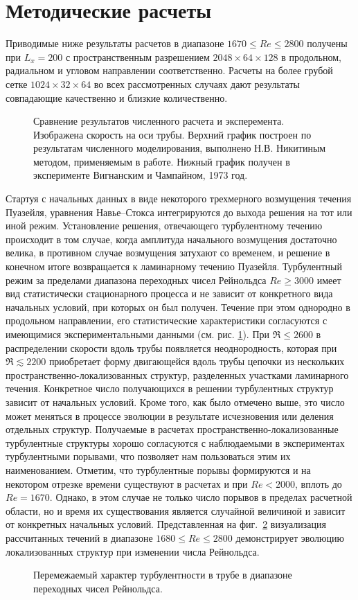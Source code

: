 \section{Методические расчеты} 
	\label{puff_calc}



Приводимые ниже результаты расчетов в диапазоне $1670\leqslant Re\leqslant 2800$ получены при $L_x=200$ с пространственным разрешением $2048 \times 64 \times 128$ в продольном, радиальном и угловом направлении соответственно. Расчеты на более грубой сетке $1024\times32\times64$ во всех рассмотренных случаях дают результаты совпадающие качественно и близкие количественно.

\begin{figure}[h]
\caption{Сравнение результатов численного расчета и эксперемента. Изображена скорость на оси трубы. Верхний график построен по результатам численного моделирования, выполнено Н.В. Никитиным методом, применяемым в работе. Нижный график получен в эксперименте Вигнанским и Чампайном, 1973 год.}
\label{exper_img}
\end{figure}

Стартуя с начальных данных в виде некоторого трехмерного возмущения течения Пуазейля, уравнения Навье--Стокса интегрируются до выхода решения на тот или иной режим. Установление решения, отвечающего турбулентному течению происходит в том случае, когда амплитуда начального возмущения достаточно велика, в противном случае возмущения затухают со временем, и решение в конечном итоге возвращается к ламинарному течению Пуазейля. Турбулентный режим за пределами диапазона переходных чисел Рейнольдса $Re\geqslant3000$ имеет вид статистически стационарного процесса и не зависит от конкретного вида начальных условий, при которых он был получен. Течение при этом однородно в продольном направлении, его статистические характеристики согласуются с имеющимися экспериментальными данными (см. рис. \ref{exper_img}). При $\Re\leqslant2600$ в распределении скорости вдоль трубы появляется неоднородность, которая при $\Re\lesssim2200$ приобретает форму двигающейся вдоль трубы цепочки из нескольких пространственно-локализованных структур, разделенных участками ламинарного течения. Конкретное число получающихся в решении турбулентных структур зависит от начальных условий. Кроме того, как было отмечено выше, это число может меняться в процессе эволюции в результате исчезновения или деления отдельных структур. Получаемые в расчетах пространственно-локализованные турбулентные структуры хорошо согласуются с наблюдаемыми в экспериментах турбулентными порывами, что позволяет нам пользоваться этим их наименованием. Отметим, что турбулентные порывы формируются и на некотором отрезке времени существуют в расчетах и при $Re<2000$, вплоть до $Re=1670$. Однако, в этом случае не только число порывов в пределах расчетной области, но и время их существования является случайной величиной и зависит от конкретных начальных условий. Представленная на фиг.~\ref{puffs_img} визуализация рассчитанных течений в диапазоне $1680\leqslant Re\leqslant2800$ демонстрирует эволюцию локализованных структур при изменении числа Рейнольдса.

\begin{figure}[h]
\caption{Перемежаемый характер турбулентности в трубе в диапазоне переходных чисел Рейнольдса.}
\label{puffs_img}
\end{figure}

